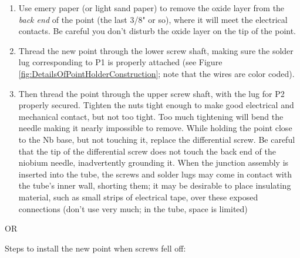 \documentclass{../lab}
\begin{document}
\begin{enumerate}
    \item Use emery paper (or light sand paper) to remove the oxide layer from the \emph{back end }of the point (the last 3/8" or so), where it will meet the electrical contacts. Be careful you don't disturb the oxide layer on the tip of the point.

    \item Thread the new point through the lower screw shaft, making sure the solder lug corresponding to P1 is properly attached (see Figure \ref{fig:DetailsOfPointHolderConstruction}; note that the wires are color coded).

    \item Then thread the point through the upper screw shaft, with the lug for P2 properly secured. Tighten the nuts tight enough to make good electrical and mechanical contact, but not too tight. Too much tightening will bend the needle making it nearly impossible to remove. While holding the point close to the Nb base, but not touching it, replace the differential screw. Be careful that the tip of the differential screw does not touch the back end of the niobium needle, inadvertently grounding it. When the junction assembly is inserted into the tube, the screws and solder lugs may come in contact with the tube's inner wall, shorting them; it may be desirable to place insulating material, such as small strips of electrical tape, over these exposed connections (don't use very much; in the tube, space is limited)

\end{enumerate}

\noindent OR

\noindent Steps to install the new point when screws fell off:
\end{document}
